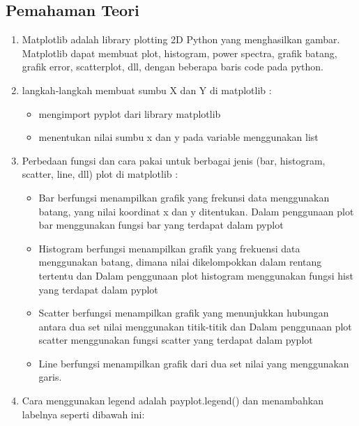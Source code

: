 \subsection{Pemahaman Teori}
\begin{enumerate}
    \item Matplotlib adalah library plotting 2D Python yang menghasilkan gambar. Matplotlib dapat membuat plot, histogram, power spectra, grafik batang, grafik error, scatterplot, dll, dengan beberapa baris code pada python.
    \item langkah-langkah membuat sumbu X dan Y di matplotlib :
    \begin{itemize}
        \item mengimport pyplot dari library matplotlib
        \item menentukan nilai sumbu x dan y pada variable menggunakan list
        
    \end{itemize}
    \item Perbedaan fungsi dan cara pakai untuk berbagai jenis (bar, histogram, scatter, line, dll) plot di matplotlib :
    \begin{itemize}
        \item Bar berfungsi menampilkan grafik yang frekunsi data menggunakan batang, yang nilai koordinat x dan y ditentukan. Dalam penggunaan plot bar menggunakan fungsi bar yang terdapat dalam pyplot
        
        \item Histogram berfungsi menampilkan grafik yang frekuensi data menggunakan batang, dimana nilai dikelompokkan dalam rentang tertentu dan  Dalam penggunaan plot histogram menggunakan fungsi hist yang terdapat dalam pyplot 
        
        \item Scatter berfungsi menampilkan grafik yang menunjukkan hubungan antara dua set nilai menggunakan titik-titik dan Dalam penggunaan plot scatter menggunakan fungsi scatter yang terdapat dalam pyplot
        
        \item Line berfungsi menampilkan grafik dari dua set nilai yang menggunakan garis.
        
    \end{itemize}
    \item Cara menggunakan legend adalah payplot.legend() dan menambahkan labelnya seperti dibawah ini:

\end{enumerate}
